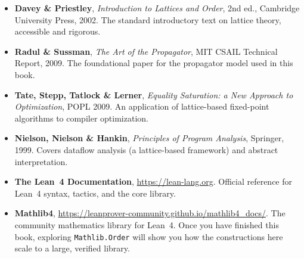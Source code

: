 \documentclass[12pt, a4paper, openright]{book}
\theoremstyle{thmstyle}
\theoremstyle{defstyle}
\begin{document}
\begin{itemize}
  \item \textbf{Davey \& Priestley}, \emph{Introduction to Lattices and Order},
    2nd ed., Cambridge University Press, 2002.
    The standard introductory text on lattice theory, accessible and rigorous.

  \item \textbf{Radul \& Sussman}, \emph{The Art of the Propagator}, MIT CSAIL
    Technical Report, 2009.
    The foundational paper for the propagator model used in this book.

  \item \textbf{Tate, Stepp, Tatlock \& Lerner}, \emph{Equality Saturation: a
    New Approach to Optimization}, POPL 2009.
    An application of lattice-based fixed-point algorithms to compiler optimization.

  \item \textbf{Nielson, Nielson \& Hankin}, \emph{Principles of Program Analysis},
    Springer, 1999.
    Covers dataflow analysis (a lattice-based framework) and abstract interpretation.

  \item \textbf{The Lean~4 Documentation}, \url{https://lean-lang.org}.
    Official reference for Lean~4 syntax, tactics, and the core library.

  \item \textbf{Mathlib4}, \url{https://leanprover-community.github.io/mathlib4_docs/}.
    The community mathematics library for Lean~4.
    Once you have finished this book, exploring \texttt{Mathlib.Order} will
    show you how the constructions here scale to a large, verified library.
\end{itemize}
\end{document}
